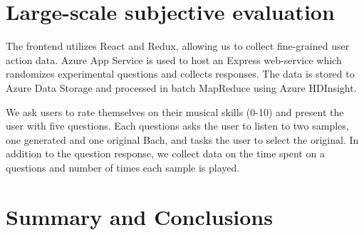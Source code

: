 \documentclass[a4paper,12pt,twoside,openright]{report}
\begin{document}
\chapter{Large-scale subjective evaluation}

The frontend utilizes React and Redux, allowing us to collect fine-grained user
action data. Azure App Service is used to host an Express web-service which
randomizes experimental questions and collects responses. The data is stored to
Azure Data Storage and processed in batch MapReduce using Azure HDInsight.

We ask users to rate themselves on their musical skills (0-10) and present the
user with five questions. Each questions asks the user to listen to two
samples, one generated and one original Bach, and tasks the user to select the
original. In addition to the question response, we collect data on the time
spent on a questions and number of times each sample is played.


\chapter{Summary and Conclusions}




\appendix
\singlespacing




\printindex
\end{document}
